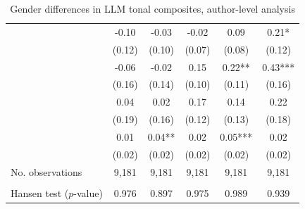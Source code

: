 \begin{table}
    \footnotesize
    \centering
    \begin{threeparttable}
        \caption{Gender differences in LLM tonal composites, author-level analysis}
        \label{table4llm_FemRatio}
        \begin{tabular}{p{3cm}S@{}S@{}S@{}S@{}S@{}}
            \toprule
            &{}&{}&{}&{}&{}\\
            \midrule
            &       -0.10   &       -0.03   &       -0.02   &        0.09   &        0.21*  \\
                                          &      (0.12)   &      (0.10)   &      (0.07)   &      (0.08)   &      (0.12)   \\
            &       -0.06   &       -0.02   &        0.15   &        0.22** &        0.43***\\
                                          &      (0.16)   &      (0.14)   &      (0.10)   &      (0.11)   &      (0.16)   \\
            &        0.04   &        0.02   &        0.17   &        0.14   &        0.22   \\
                                          &      (0.19)   &      (0.16)   &      (0.12)   &      (0.13)   &      (0.18)   \\
            &        0.01   &        0.04** &        0.02   &        0.05***&        0.02   \\
                                          &      (0.02)   &      (0.02)   &      (0.02)   &      (0.02)   &      (0.02)   \\
            \midrule
            No. observations      &       9,181   &       9,181   &       9,181   &       9,181   &       9,181   \\
             \\\quad Hansen test (\(p\)-value)&       0.976   &       0.897   &       0.975   &       0.989   &       0.939   \\

\end{tabular}
\end{threeparttable}
\end{table}
